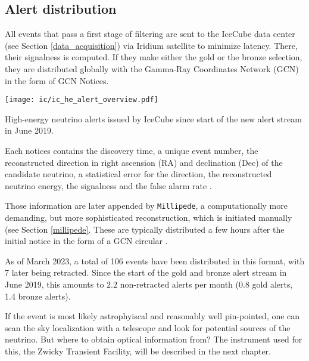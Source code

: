 \subsection{Alert distribution} \label{ic_alerts}
All events that pass a first stage of filtering are sent to the IceCube data center (see Section \ref{data_acquisition}) via Iridium satellite to minimize latency. There, their signalness is computed. If they make either the gold or the bronze selection, they are distributed globally with the Gamma-Ray Coordinates Network (GCN) in the form of GCN Notices.
\begin{marginfigure}
    \texttt{[image: ic/ic\_he\_alert\_overview.pdf]}
    \caption[IceCube alert overview]{High-energy neutrino alerts issued by IceCube since start of the new alert stream in June 2019.}
\end{marginfigure}
Each notices contains the discovery time, a unique event number, the reconstructed direction in right ascension (RA) and declination (Dec) of the candidate neutrino, a statistical error for the direction, the reconstructed neutrino energy, the signalness and the false alarm rate \cite{Tung2019}.

Those information are later appended by \texttt{Millipede}, a computationally more demanding, but more sophisticated reconstruction, which is initiated manually (see Section \ref{millipede}. These are typically distributed a few hours after the initial notice in the form of a GCN circular \cite{Tung2019}.

As of March 2023, a total of 106 events have been distributed in this format, with 7 later being retracted. Since the start of the gold and bronze alert stream in June 2019, this amounts to $2.2$ non-retracted alerts per month (0.8 gold alerts, 1.4 bronze alerts).

If the event is most likely astrophyiscal and reasonably well pin-pointed, one can scan the sky localization with a telescope and look for potential sources of the neutrino. But where to obtain optical information from? The instrument used for this, the Zwicky Transient Facility, will be described in the next chapter.